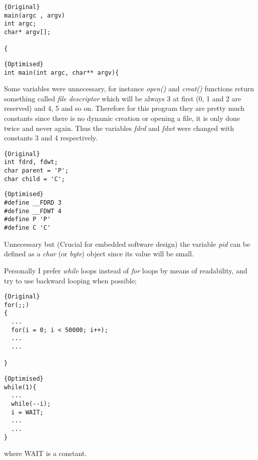 \documentclass[11pt]{article}
\begin{document}
\noindent\begin{minipage}{.45\textwidth}
\begin{lstlisting}[caption=Original,frame=tlrb]{Original}
main(argc , argv)
int argc; 
char* argv[];

{
\end{lstlisting}
\end{minipage}\hfill
\begin{minipage}{.50\textwidth}
\begin{lstlisting}[caption=Optimised,frame=tlrb]{Optimised}
int main(int argc, char** argv){
\end{lstlisting}
\end{minipage}

Some variables were unnecessary, for instance \textit{open()} and \textit{creat()} functions return something called \textit{file descriptor} which will be always 3 at first (0, 1 and 2 are reserved) and 4, 5 and so on. Therefore for this program they are pretty much constants since there is no dynamic creation or opening a file, it is only done twice and never again. Thus the variables \textit{fdrd} and \textit{fdwt} were changed with constants 3 and 4 respectively.

\noindent\begin{minipage}{.45\textwidth}
\begin{lstlisting}[caption=Original,frame=tlrb]{Original}
int fdrd, fdwt;
char parent = 'P';
char child = 'C';
\end{lstlisting}
\end{minipage}\hfill
\begin{minipage}{.50\textwidth}
\begin{lstlisting}[caption=Optimised,frame=tlrb]{Optimised}
#define __FDRD 3
#define __FDWT 4
#define P 'P'
#define C 'C'
\end{lstlisting}
\end{minipage}

Unnecessary but (Crucial for embedded software design) the variable \textit{pid} can be defined as a \textit{char} (or \textit{byte}) object since its value will be small.

Personally I prefer \textit{while} loops instead of \textit{for} loops by means of readability, and try to use backward looping when possible;

\noindent\begin{minipage}{.45\textwidth}
\begin{lstlisting}[caption=Original,frame=tlrb]{Original}
for(;;)
{
  ...
  for(i = 0; i < 50000; i++);
  ...
  ...

}
\end{lstlisting}
\end{minipage}\hfill
\begin{minipage}{.50\textwidth}
\begin{lstlisting}[caption=Optimised,frame=tlrb]{Optimised}
while(1){
  ...
  while(--i);
  i = WAIT;
  ...
  ...
}
\end{lstlisting}
\end{minipage}
where WAIT is a constant.
\end{document}
